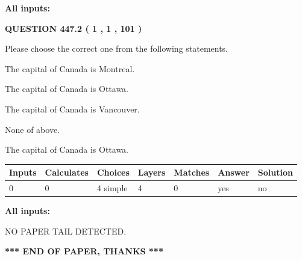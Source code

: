 \documentclass[12pt]{article}
\begin{document}
   
\noindent\vspace{0.1in}\hspace{-0.08in} {\textbf{\Large{All inputs: }}}
   
   
  
\vspace{0.2in}
  
{\textbf{\Large{QUESTION
447.2 
 ( 1 , 1 , 101 )
}}}
  
  
Please choose the correct one from the following statements.
 
 
The capital of Canada is Montreal.
 
 
The capital of Canada is Ottawa.
 
 
The capital of Canada is Vancouver.
 
 
 None of above.
 
 
\noindent{}
 
 
The capital of Canada is Ottawa.
 
 
\noindent{}
 
 
   
   
   
   
\noindent\begin{tabular}{|l|l|l|l|l|l|l|}
 \hline
Inputs & Calculates & Choices & Layers & Matches & Answer & Solution \\ \hline
 0  & 
 0  & 
 4
  simple  
  & 
 4  & 
 0  & 
  yes & 
  no 
  \\ \hline
 \end{tabular}
   
   
   
   
\noindent{}
   
   
   
   
\noindent\vspace{0.1in}\hspace{-0.08in} {\textbf{\Large{All inputs: }}}
   
   
   
   
\vspace{2.0in} NO PAPER TAIL DETECTED.
   
   
   
   
\vspace{1.0in} 
{\textbf{\large{ *** END OF PAPER, THANKS *** }}} 
   
\end{document}
